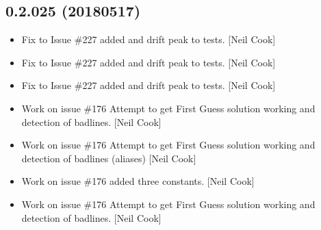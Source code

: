 \documentclass[a4paper,10pt,english]{report}
\begin{document}
\subsection{0.2.025 (2018\sphinxhyphen{}05\sphinxhyphen{}17)}
\label{\detokenize{misc/changelog:id455}}\begin{itemize}
\item {} 
Fix to Issue \#227 \sphinxhyphen{} added  and drift peak to tests. {[}Neil
Cook{]}

\item {} 
Fix to Issue \#227 \sphinxhyphen{} added  and drift peak to tests. {[}Neil
Cook{]}

\item {} 
Fix to Issue \#227 \sphinxhyphen{} added  and drift peak to tests. {[}Neil
Cook{]}

\item {} 
Work on issue \#176 \sphinxhyphen{} Attempt to get First Guess solution working and
detection of badlines. {[}Neil Cook{]}

\item {} 
Work on issue \#176 \sphinxhyphen{} Attempt to get First Guess solution working and
detection of badlines (aliases) {[}Neil Cook{]}

\item {} 
Work on issue \#176 \sphinxhyphen{} added three  constants. {[}Neil Cook{]}

\item {} 
Work on issue \#176 \sphinxhyphen{} Attempt to get First Guess solution working and
detection of badlines. {[}Neil Cook{]}

\end{itemize}
\end{document}
